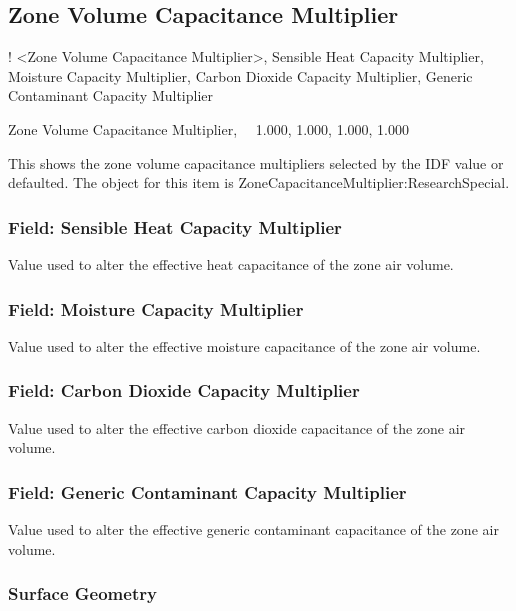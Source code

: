 \subsection{Zone Volume Capacitance Multiplier}\label{zone-volume-capacitance-multiplier}

! \textless{}Zone Volume Capacitance Multiplier\textgreater{}, Sensible Heat Capacity Multiplier, Moisture Capacity Multiplier, Carbon Dioxide Capacity Multiplier, Generic Contaminant Capacity Multiplier

Zone Volume Capacitance Multiplier,~~ 1.000, 1.000, 1.000, 1.000

This shows the zone volume capacitance multipliers selected by the IDF value or defaulted. The object for this item is ZoneCapacitanceMultiplier:ResearchSpecial.

\subsubsection{Field: Sensible Heat Capacity Multiplier}\label{field-sensible-heat-capacity-multiplier}

Value used to alter the effective heat capacitance of the zone air volume.

\subsubsection{Field: Moisture Capacity Multiplier}\label{field-moisture-capacity-multiplier}

Value used to alter the effective moisture capacitance of the zone air volume.

\subsubsection{Field: Carbon Dioxide Capacity Multiplier}\label{field-carbon-dioxide-capacity-multiplier}

Value used to alter the effective carbon dioxide capacitance of the zone air volume.

\subsubsection{Field: Generic Contaminant Capacity Multiplier}\label{field-generic-contaminant-capacity-multiplier}

Value used to alter the effective generic contaminant capacitance of the zone air volume.

\subsubsection{Surface Geometry}\label{surface-geometry}

